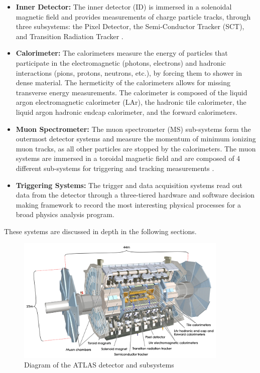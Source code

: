\begin{itemize}

\item \textbf{Inner Detector:} The inner detector (ID)\cite{IDTDR1,IDTDR2} is immersed in a solenoidal magnetic field\cite{MagnetTDR} and provides measurements of charge particle tracks, through three subsystems: the Pixel Detector\cite{PixelTDR,PixelSensor}, the Semi-Conductor Tracker (SCT)\cite{SCTBarrel,SCTEndcap}, and Transition Radiation Tracker \cite{TRTStraws, TRTBarrel,trtelec}. 

\item \textbf{Calorimeter:} The calorimeters measure the energy of particles that participate in the electromagnetic (photons, electrons) and hadronic interactions (pions, protons, neutrons, etc.), by forcing them to shower in dense material. The hermeticity of the calorimeters allows for missing transverse energy measurements. The calorimeter is composed of the liquid argon electromagnetic calorimeter (LAr)\cite{LArTDR:1996fq}, the hadronic tile calorimeter\cite{TileTDR}, the liquid argon hadronic endcap calorimeter, and the forward calorimeters.

\item \textbf{Muon Spectrometer:} The muon spectrometer (MS) sub-systems\cite{MuonTDR} form the outermost detector systems and measure the momentum of minimum ionizing muon tracks, as all other particles are stopped by the calorimeters. The muon systems are immersed in a toroidal magnetic field \cite{MagnetTDR} and are composed of 4 different sub-systems for triggering and tracking measurements \cite{RPCPaper,MDTPaper,CSCPaper}. 

\item \textbf{Triggering Systems:}  The trigger and data acquisition systems\cite{L1TDR,HLTTDR} read out data from the detector through a three-tiered hardware and software decision making framework to record the most interesting physical processes for a broad physics analysis program.   

\end{itemize}


These systems are discussed in depth in the following sections.
\begin{figure}[!t]
\centering 
\includegraphics[width=0.9\textwidth]{figs/lhc/ATLAS-eps-converted-to.pdf}
\caption{ Diagram of the ATLAS detector and subsystems 
}
\label{figure:lhc_atlas}
\end{figure}


